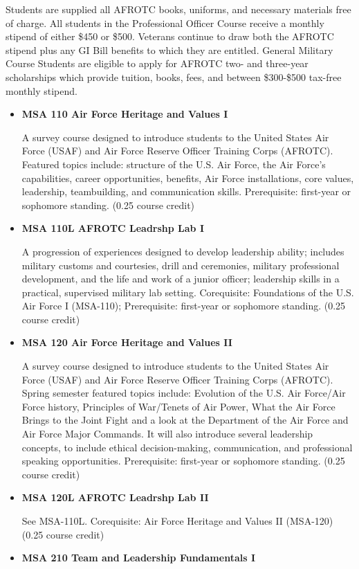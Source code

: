 \documentclass[
  letterpaper,
]{scrbook}
\begin{document}
Students are supplied all AFROTC books, uniforms, and necessary
materials free of charge. All students in the Professional Officer
Course receive a monthly stipend of either \$450 or \$500. Veterans
continue to draw both the AFROTC stipend plus any GI Bill benefits to
which they are entitled. General Military Course Students are eligible
to apply for AFROTC two- and three-year scholarships which provide
tuition, books, fees, and between \$300-\$500 tax-free monthly stipend.

\begin{itemize}
\item
  \textbf{MSA 110 Air Force Heritage and Values I}

  A survey course designed to introduce students to the United States
  Air Force (USAF) and Air Force Reserve Officer Training Corps
  (AFROTC). Featured topics include: structure of the U.S. Air Force,
  the Air Force's capabilities, career opportunities, benefits, Air
  Force installations, core values, leadership, teambuilding, and
  communication skills. Prerequisite: first-year or sophomore standing.
  (0.25 course credit)
\item
  \textbf{MSA 110L AFROTC Leadrshp Lab I}

  A progression of experiences designed to develop leadership ability;
  includes military customs and courtesies, drill and ceremonies,
  military professional development, and the life and work of a junior
  officer; leadership skills in a practical, supervised military lab
  setting. Corequisite: Foundations of the U.S. Air Force I (MSA-110);
  Prerequisite: first-year or sophomore standing. (0.25 course credit)
\item
  \textbf{MSA 120 Air Force Heritage and Values II}

  A survey course designed to introduce students to the United States
  Air Force (USAF) and Air Force Reserve Officer Training Corps
  (AFROTC). Spring semester featured topics include: Evolution of the
  U.S. Air Force/Air Force history, Principles of War/Tenets of Air
  Power, What the Air Force Brings to the Joint Fight and a look at the
  Department of the Air Force and Air Force Major Commands. It will also
  introduce several leadership concepts, to include ethical
  decision-making, communication, and professional speaking
  opportunities. Prerequisite: first-year or sophomore standing. (0.25
  course credit)
\item
  \textbf{MSA 120L AFROTC Leadrshp Lab II}

  See MSA-110L. Corequisite: Air Force Heritage and Values II (MSA-120)
  (0.25 course credit)
\item
  \textbf{MSA 210 Team and Leadership Fundamentals I}


\end{itemize}
\end{document}
